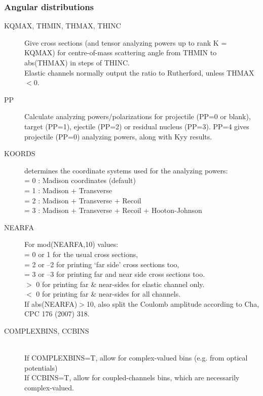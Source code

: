 \documentclass[11pt]{article}
\begin{document}
\subsubsection{Angular distributions}

\begin{description}

\item[KQMAX, THMIN, THMAX, THINC]

Give cross sections (and tensor analyzing powers up to rank K = KQMAX)
for centre-of-mass scattering angle from THMIN
to abs(THMAX) in steps of THINC.\\
Elastic channels normally output the ratio to Rutherford, unless THMAX $< 0$.

\item[PP]
Calculate analyzing powers/polarizations for projectile (PP=0 or blank),
target (PP=1), ejectile (PP=2) or residual nucleus (PP=3).
PP=4 gives projectile (PP=0) analyzing powers, along with Kyy results.

\item[KOORDS ]determines the coordinate systems used for the analyzing powers:
\\  = 0 : Madison coordinates (default)
\\  = 1 : Madison + Transverse
\\  = 2 : Madison + Transverse + Recoil
\\  = 3 : Madison + Transverse + Recoil + Hooton-Johnson

\item[NEARFA]
For mod(NEARFA,10) values: 
\\ = 0 or 1 for the usual cross sections,
\\  = 2 or --2 for printing `far side' cross sections too,
\\  = 3 or --3 for printing far and near side cross sections too.
\\  $>$ 0 for printing far \& near-sides for elastic channel only.
\\  $<$ 0 for printing far \& near-sides for all channels.\\
If abs(NEARFA)$>$10, also split the Coulomb amplitude according to Cha, CPC 176 (2007) 318.

\item[COMPLEXBINS, CCBINS]  ~\\
If COMPLEXBINS=T, allow for complex-valued bins (e.g. from optical potentials)\\
If CCBINS=T, allow for coupled-channels bins, which are necessarily complex-valued.




\end{description}
\end{document}
